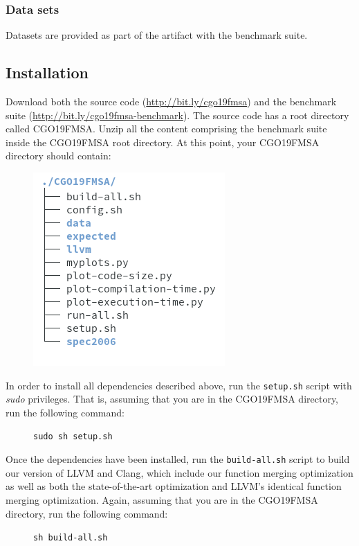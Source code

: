 {\subsubsection{Data sets}

Datasets are provided as part of the artifact with the benchmark suite.

\subsection{Installation}

Download both the source code (\url{http://bit.ly/cgo19fmsa}) and the benchmark suite
(\url{http://bit.ly/cgo19fmsa-benchmark}).
The source code has a root directory called CGO19FMSA.
Unzip all the content comprising the benchmark suite inside the CGO19FMSA root directory.
At this point, your CGO19FMSA directory should contain:
\begin{figure}[h]
\includegraphics[scale=0.5]{figs/artifact/tree.png}
\end{figure}

In order to install all dependencies described above, run the \texttt{setup.sh}
script with \textit{sudo} privileges. That is, assuming that you are in the
CGO19FMSA directory, run the following command:
\begin{figure}[h]
\texttt{sudo sh setup.sh}
\end{figure}

Once the dependencies have been installed, run the \texttt{build-all.sh}
script to build our version of LLVM and Clang, which include our function
merging optimization as well as both the state-of-the-art optimization and LLVM's
identical function merging optimization.
Again, assuming that you are in the CGO19FMSA directory, run the following
command:
\begin{figure}[h]
\texttt{sh build-all.sh}
\end{figure}

}
